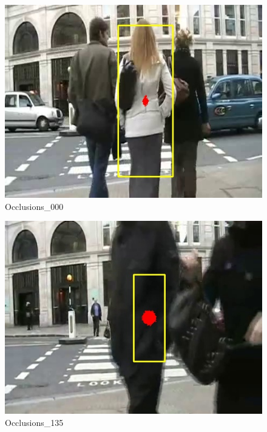 \documentclass[10pt, conference, compsocconf]{IEEEtran}
\begin{document}
\begin{figure}[H]
	\centering
	\includegraphics[scale = 0.50]{image/p3/000.jpg}
	\caption{Occlusions\_000}
	\label{fig:Occlusions000}
\end{figure}

\begin{figure}[H]
	\centering
	\includegraphics[scale = 0.50]{image/p3/135.jpg}
	\caption{Occlusions\_135}
	\label{fig:p3_135}
\end{figure}
\end{document}
